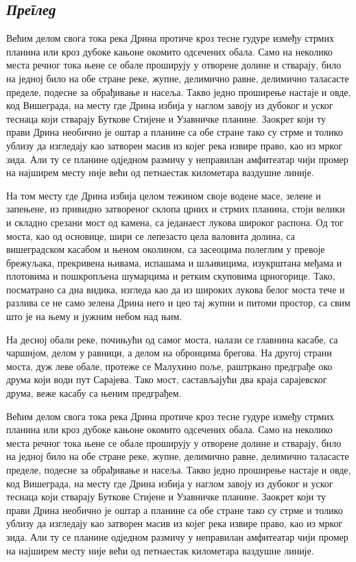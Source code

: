 \documentclass{UUThesisTemplate}
\begin{document}
\newpage
\begin{serbian}
\chapter{\emph{Преглед}}
{\noteunic

\par
\noindent Већим делом свога тока река Дрина протиче кроз тесне гудуре између стрмих планина или кроз дубоке кањоне окомито одсечених обала. Само на неколико места речног тока њене се обале проширују у отворене долине и стварају, било на једној било на обе стране реке, жупне, делимично равне, делимично таласасте пределе, подесне за обрађивање и насеља. Такво једно проширење настаје и овде, код Вишеграда, на месту где Дрина избија у наглом завоју из дубоког и уског теснаца који стварају Буткове Стијене и Узавничке планине. Заокрет који ту прави Дрина необично је оштар а планине са обе стране тако су стрме и толико ублизу да изгледају као затворен масив из којег река извире право, као из мрког зида. Али ту се планине одједном размичу у неправилан амфитеатар чији промер на најширем месту није већи од петнаестак километара ваздушне линије.

\par
На том месту где Дрина избија целом тежином своје водене масе, зелене и запењене, из привидно затвореног склопа црних и стрмих планина, стоји велики и складно срезани мост од камена, са једанаест лукова широког распона. Од тог моста, као од основице, шири се лепезасто цела валовита долина, са вишеградском касабом и њеном околином, са засеоцима полеглим у превоје брежуљака, прекривена њивама, испашама и шљивицима, изукрштана међама и плотовима и пошкропљена шумарцима и ретким скуповима црногорице. Тако, посматрано са дна видика, изгледа као да из широких лукова белог моста тече и разлива се не само зелена Дрина него и цео тај жупни и питоми простор, са свим што је на њему и јужним небом над њим.

\par
На десној обали реке, почињући од самог моста, налази се главнина касабе, са чаршијом, делом у равници, а делом на обронцима брегова. На другој страни моста, дуж леве обале, протеже се Малухино поље, раштркано предграђе око друма који води пут Сарајева. Тако мост, састављајући два краја сарајевског друма, веже касабу са њеним предграђем.

\par
Већим делом свога тока река Дрина протиче кроз тесне гудуре између стрмих планина или кроз дубоке кањоне окомито одсечених обала. Само на неколико места речног тока њене се обале проширују у отворене долине и стварају, било на једној било на обе стране реке, жупне, делимично равне, делимично таласасте пределе, подесне за обрађивање и насеља. Такво једно проширење настаје и овде, код Вишеграда, на месту где Дрина избија у наглом завоју из дубоког и уског теснаца који стварају Буткове Стијене и Узавничке планине. Заокрет који ту прави Дрина необично је оштар а планине са обе стране тако су стрме и толико ублизу да изгледају као затворен масив из којег река извире право, као из мрког зида. Али ту се планине одједном размичу у неправилан амфитеатар чији промер на најширем месту није већи од петнаестак километара ваздушне линије.

}
\end{serbian}
\end{document}
